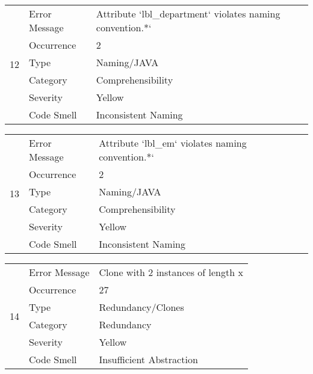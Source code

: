 \documentclass[12pt,english]{article}
\begin{document}
\begin{table}[!ht]
    \begin{tabularx}{\textwidth}{|c|l|X|}
    \hline
        \multirow{6}{*}{12} & Error Message & Attribute `lbl\_department` violates naming convention.*` \\ \cline{2-3}
        & Occurrence & 2 \\ \cline{2-3}
        & Type & Naming/JAVA \\ \cline{2-3}
        & Category & Comprehensibility \\ \cline{2-3}
        & Severity & Yellow \\ \cline{2-3}
        & Code Smell & Inconsistent Naming \\ \hline
    \end{tabularx}
\end{table}

\begin{table}[!ht]
    \begin{tabularx}{\textwidth}{|c|l|X|}
    \hline
        \multirow{6}{*}{13} & Error Message & Attribute `lbl\_em` violates naming convention.*` \\ \cline{2-3}
        & Occurrence & 2 \\ \cline{2-3}
        & Type & Naming/JAVA \\ \cline{2-3}
        & Category & Comprehensibility \\ \cline{2-3}
        & Severity & Yellow \\ \cline{2-3}
        & Code Smell & Inconsistent Naming \\ \hline
    \end{tabularx}
\end{table}

\begin{table}[!ht]
    \begin{tabularx}{\textwidth}{|c|l|X|}
    \hline
        \multirow{6}{*}{14} & Error Message & Clone with 2 instances of length x \\ \cline{2-3}
        & Occurrence & 27 \\ \cline{2-3}
        & Type & Redundancy/Clones \\ \cline{2-3}
        & Category & Redundancy \\ \cline{2-3}
        & Severity & Yellow \\ \cline{2-3}
        & Code Smell & Insufficient Abstraction \\ \hline
    \end{tabularx}
\end{table}
\end{document}
